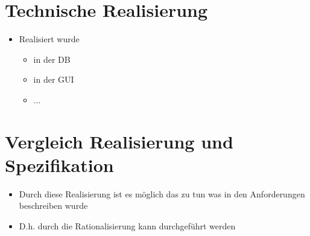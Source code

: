 \section{Technische Realisierung}
\begin{itemize}
	\item Realisiert wurde
	\begin{itemize}
		\item in der DB
		\item in der GUI
		\item ...
	\end{itemize}
\end{itemize}


\section{Vergleich Realisierung und Spezifikation}
\begin{itemize}
	\item Durch diese Realisierung ist es möglich das zu tun was in den Anforderungen beschreiben wurde
	\item D.h. durch die Rationalisierung kann durchgeführt werden
\end{itemize}
